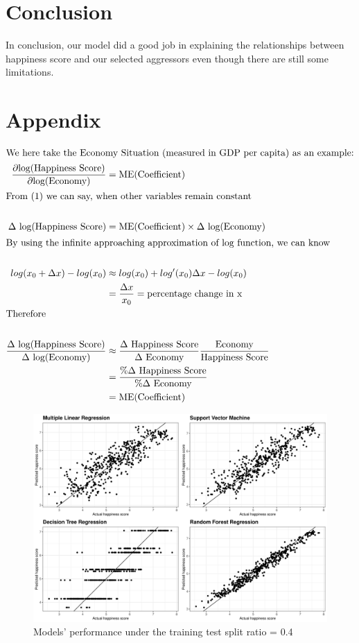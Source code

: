 \documentclass[11pt,a4paper,]{article}
\begin{document}
\clearpage

\hypertarget{conclusion}{%
\section{Conclusion}\label{conclusion}}

In conclusion, our model did a good job in explaining the relationships between happiness score and our selected aggressors even though there are still some limitations.

\clearpage

\hypertarget{appendix}{%
\section{Appendix}\label{appendix}}

\begin{align*}
\intertext{We here take the Economy Situation (measured in GDP per capita) as an example:}
\frac{\partial \text{log(Happiness Score)}}{\partial \text{log(Economy)}} &= \text{ME(Coefficient)}\\
\intertext{From (1) we can say, when other variables remain constant }\nonumber \\
\Delta \text{ log(Happiness Score)} &= \text{ME(Coefficient)} \times \Delta \text{ log(Economy)}\\
\intertext{By using the infinite approaching approximation of log function, we can know}\nonumber\\
log(x_0 + \Delta x) - log(x_0) &\approx log(x_0) + log'(x_0)\Delta x - log(x_0)\\
&=  \frac{\Delta x}{x_0} = \text{percentage change in x}\nonumber\\
\intertext{Therefore}\nonumber\\
\frac{\Delta \text{ log(Happiness Score)}}{\Delta \text{ log(Economy)}} &\approx \frac{\Delta \text{ Happiness Score}}{\Delta \text{ Economy} }\frac{\text{Economy}}{\text{Happiness Score}}\\
&=\frac{\% \Delta \text{ Happiness Score}}{\% \Delta \text{ Economy}} \nonumber\\
&= \text{ME(Coefficient)}\nonumber
\end{align*}

\begin{figure}

{\centering \includegraphics[width=0.7\linewidth]{figure/ggsp04} 

}

\caption{Models' performance under the training test split ratio = 0.4}\label{fig:ggsp04}
\end{figure}
\end{document}
